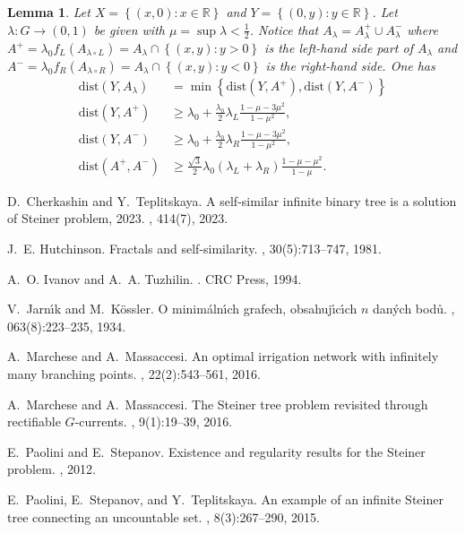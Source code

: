 \documentclass{amsart}
\newcommand{\RR}{\mathbb R}
\newcommand{\ENCLOSE}[1]{\left\{#1\right\}}
\newcommand{\dist}{\mathrm{dist}}
\newtheorem{lemma}[theorem]{Lemma}
\theoremstyle{definition}
\theoremstyle{remark}
\begin{document}
\begin{lemma}\label{lm:precedente1}
  Let $X=\ENCLOSE{(x,0)\colon x\in \RR}$ and $Y=\ENCLOSE{(0,y)\colon y\in \RR}$.
  Let $\lambda\colon G\to (0,1)$ be given with $\mu=\sup \lambda <\frac 1 2$.
  Notice that $A_\lambda = A_\lambda^+ \cup A_\lambda^-$ where 
  $A^+ = \lambda_0 f_L(A_{\lambda\circ L}) = A_\lambda \cap \ENCLOSE{(x,y)\colon y>0}$ 
  is the left-hand side 
  part of $A_\lambda$
  and $A^- = \lambda_0 f_R(A_{\lambda\circ R}) = A_\lambda \cap\ENCLOSE{(x,y)\colon y<0}$ 
  is the right-hand side.
  One has
  \begin{align*}
      \dist(Y,A_\lambda) 
      &= \min \ENCLOSE{\dist(Y,A^+),\dist(Y,A^-)}\\
      \dist(Y,A^+)
      & \ge \lambda_0 + \frac{\lambda_0}{2} \lambda_L\frac{1-\mu-3\mu^2}{1-\mu^2}, \\
      \dist(Y,A^-)
      & \ge \lambda_0 + \frac{\lambda_0}{2} \lambda_R\frac{1-\mu-3\mu^2}{1-\mu^2}, \\
      \dist(A^+,A^-) &\ge 
      \frac{\sqrt 3}{2} \lambda_0(\lambda_L+\lambda_R)\frac{1-\mu-\mu^2}{1-\mu}.
  \end{align*}
  \end{lemma}  


%
\begin{thebibliography}{1}

  D.~Cherkashin and Y.~Teplitskaya.
  \newblock A self-similar infinite binary tree is a solution of Steiner problem,
    2023.
  , 
  414(7), 2023.
  
  J.~E. Hutchinson.
  \newblock Fractals and self-similarity.
  , 30(5):713--747, 1981.
  
  A.~O. Ivanov and A.~A. Tuzhilin.
  .
  \newblock CRC Press, 1994.
  
  V.~Jarn\'\i{}k and M.~K\"o{}ssler.
  \newblock O minim\'a{}ln\'\i{}ch grafech, obsahuj\'\i{}c\'\i{}ch $n$ dan\'y{}ch
    bod\r u{}.
  ,
    063(8):223--235, 1934.
  
  A.~Marchese and A.~Massaccesi.
  \newblock An optimal irrigation network with infinitely many branching points.
  , 22(2):543--561, 2016.
  
  A.~Marchese and A.~Massaccesi.
  \newblock The {S}teiner tree problem revisited through rectifiable
    {$G$}-currents.
  , 9(1):19--39, 2016.
  
  E.~Paolini and E.~Stepanov.
  \newblock Existence and regularity results for the Steiner problem.
  , 2012.
  
  E.~Paolini, E.~Stepanov, and Y.~Teplitskaya.
  \newblock An example of an infinite {S}teiner tree connecting an uncountable
    set.
  , 8(3):267--290, 2015.
\end{thebibliography}
    
\end{document}
